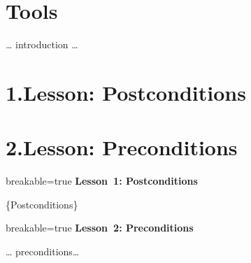 \documentclass{article}
\begin{document}
\newpage{}%

\section*{{\mdfontsize{20pt}Tools}}\label{sec-tools}%

\noindent{}\dots{} introduction \dots{}%

\newpage{}%

\section{{\mdfontsize{20pt}1.\hspace*{0.5em}Lesson: Postconditions}}\label{sec-lesson--postconditions}%

\section{{\mdfontsize{20pt}2.\hspace*{0.5em}Lesson: Preconditions}}\label{sec-lesson--preconditions}%

\newpage%
\begin{mdblock}{breakable=true}%
{\mdfontsize{20pt}
\noindent{}\textbf{Lesson~1: Postconditions}%
}%
\end{mdblock}%

\noindent{}\{Postconditions\}%

\newpage%
\begin{mdblock}{breakable=true}%
{\mdfontsize{20pt}
\noindent{}\textbf{Lesson~2: Preconditions}%
}%
\end{mdblock}%

\noindent{}\dots{} preconditions\dots{}%
\end{document}
